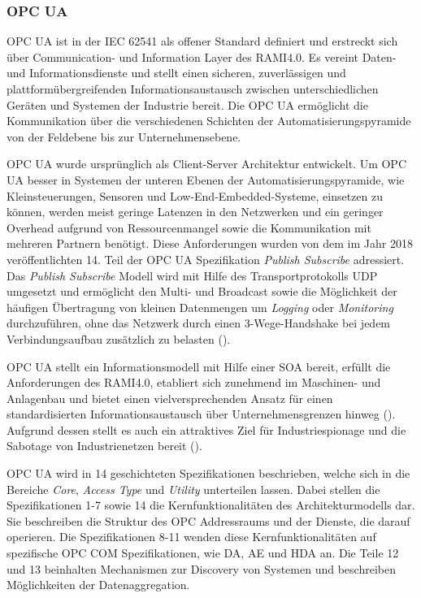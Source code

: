 \subsubsection{\ac{OPC UA}}
\ac{OPC UA} ist in der \ac{IEC} 62541 als offener Standard definiert und erstreckt sich über Communication- und Information Layer des \ac{RAMI4.0}. Es vereint Daten- und Informationsdienste und stellt einen sicheren, zuverlässigen und plattformübergreifenden Informationsaustausch zwischen unterschiedlichen Geräten und Systemen der Industrie bereit. Die \ac{OPC UA} ermöglicht die Kommunikation über die verschiedenen Schichten der Automatisierungspyramide von der Feldebene bis zur Unternehmensebene. 

\ac{OPC UA} wurde ursprünglich als Client-Server Architektur entwickelt. Um \ac{OPC UA} besser in Systemen der unteren Ebenen der Automatisierungspyramide, wie Kleinsteuerungen, Sensoren und Low-End-Embedded-Systeme, einsetzen zu können, werden meist geringe Latenzen in den Netzwerken und ein geringer Overhead aufgrund von Ressourcenmangel sowie die Kommunikation mit mehreren Partnern benötigt. Diese Anforderungen wurden von dem im Jahr 2018 veröffentlichten 14. Teil der \ac{OPC UA} Spezifikation \textit{Publish Subscribe} adressiert. Das \textit{Publish Subscribe} Modell wird mit Hilfe des Transportprotokolls \ac{UDP} umgesetzt und ermöglicht den Multi- und Broadcast sowie die Möglichkeit der häufigen Übertragung von kleinen Datenmengen um \textit{Logging} oder \textit{Monitoring} durchzuführen, ohne das Netzwerk durch einen 3-Wege-Handshake bei jedem Verbindungsaufbau zusätzlich zu belasten (\cite{opcpt1}).

\ac{OPC UA} stellt ein Informationsmodell mit Hilfe einer \ac{SOA} bereit, erfüllt die Anforderungen des \ac{RAMI4.0}, etabliert sich zunehmend im Maschinen- und Anlagenbau und bietet einen vielversprechenden Ansatz für einen standardisierten Informationsaustausch über Unternehmensgrenzen hinweg (\cite{OPCWegbereiter2014}). Aufgrund dessen stellt es auch ein attraktives Ziel für Industriespionage und die Sabotage von Industrienetzen bereit (\cite{opcpt2}). 

\ac{OPC UA} wird in 14 geschichteten Spezifikationen beschrieben, welche sich in die Bereiche \textit{Core}, \textit{Access Type} und \textit{Utility} unterteilen lassen. Dabei stellen die Spezifikationen 1-7 sowie 14 die Kernfunktionalitäten des Architekturmodells dar. Sie beschreiben die Struktur des OPC Addressraums und der Dienste, die darauf operieren. Die Spezifikationen 8-11 wenden diese Kernfunktionalitäten auf spezifische \ac{OPC COM} Spezifikationen, wie \ac{DA}, \ac{AE} und \ac{HDA} an. Die Teile 12 und 13 beinhalten Mechanismen zur Discovery von Systemen und beschreiben Möglichkeiten der Datenaggregation.

